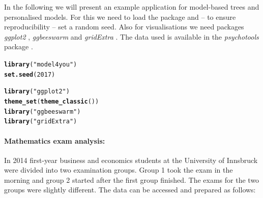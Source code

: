 \documentclass{josr}\usepackage[]{graphicx}\usepackage[]{color}
\makeatletter
\newcommand{\hlnum}[1]{\textcolor[rgb]{0.686,0.059,0.569}{#1}}%
\newcommand{\hlstr}[1]{\textcolor[rgb]{0.192,0.494,0.8}{#1}}%
\newcommand{\hlstd}[1]{\textcolor[rgb]{0.345,0.345,0.345}{#1}}%
\newcommand{\hlkwd}[1]{\textcolor[rgb]{0.737,0.353,0.396}{\textbf{#1}}}%
\newenvironment{kframe}{%
 \def\at@end@of@kframe{}%
 \ifinner\ifhmode%
  \def\at@end@of@kframe{\end{minipage}}%
  \begin{minipage}{\columnwidth}%
 \fi\fi%
 \def\FrameCommand##1{\hskip\@totalleftmargin \hskip-\fboxsep
 \colorbox{shadecolor}{##1}\hskip-\fboxsep
     \hskip-\linewidth \hskip-\@totalleftmargin \hskip\columnwidth}%
 \MakeFramed {\advance\hsize-\width
   \@totalleftmargin\z@ \linewidth\hsize
   \@setminipage}}%
 {\par\unskip\endMakeFramed%
 \at@end@of@kframe}
\newenvironment{knitrout}{}{} %
\newcommand{\new}[1]{{\color{blue} #1}}
\makeatother
\begin{document}
In the following we will present an example application for model-based trees
and personalised models. For this we need to load the package and -- to ensure
reproducibility -- set a random seed.
\new{
Also for visualisations we need packages
\emph{ggplot2} \citep{ggplot2}, \emph{ggbeeswarm} \citep{ggbeeswarm} and
\emph{gridExtra} \citep{gridExtra}. The data used is
available in the \emph{psychotools} package \citep{psychotools}.
}
\begin{knitrout}
\color{fgcolor}\begin{kframe}
\begin{alltt}
\hlkwd{library}\hlstd{(}\hlstr{"model4you"}\hlstd{)}
\hlkwd{set.seed}\hlstd{(}\hlnum{2017}\hlstd{)}

\hlkwd{library}\hlstd{(}\hlstr{"ggplot2"}\hlstd{)}
\hlkwd{theme_set}\hlstd{(}\hlkwd{theme_classic}\hlstd{())}
\hlkwd{library}\hlstd{(}\hlstr{"ggbeeswarm"}\hlstd{)}
\hlkwd{library}\hlstd{(}\hlstr{"gridExtra"}\hlstd{)}
\end{alltt}
\end{kframe}
\end{knitrout}

\paragraph{Mathematics exam analysis:}
In 2014 first-year business and economics students at the University of
Innsbruck were divided into two examination groups. Group 1 took the exam in
the morning and group 2 started after the first group finished. The exams for
the two groups were slightly different.  The data can be accessed and prepared
as follows:
\end{document}
